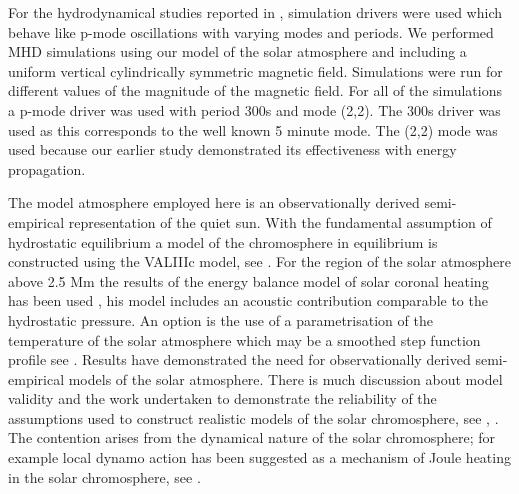 \documentclass{aastex62}
\begin{document}
For the hydrodynamical studies reported in  \citet{Griffiths2018}, simulation drivers were used which behave like p-mode oscillations with varying modes and periods. We performed MHD simulations using our model of the solar atmosphere and including a uniform vertical cylindrically symmetric magnetic field. Simulations were run for different values of the magnitude of the magnetic field. For all of the simulations a p-mode driver was used with period 300s and mode (2,2). The 300s driver  was used as this corresponds to the well known 5 minute mode. The (2,2) mode was used because our earlier study demonstrated its effectiveness with energy propagation.




The model atmosphere employed here is an observationally derived semi-empirical representation of the quiet sun. With the fundamental assumption of hydrostatic equilibrium a model of the chromosphere in equilibrium is constructed using the VALIIIc model, see \citet{Vernazza1981}. For the region of the solar atmosphere above 2.5 Mm the results of the energy balance model of solar coronal heating has been used \citep[see][]{McWhirter1975}, his model includes an acoustic contribution comparable to the hydrostatic pressure. An option is the use of a parametrisation of the temperature of the solar atmosphere which may be a smoothed step function profile see \citet{Murawski2010}. Results have demonstrated the need for observationally derived semi-empirical models of the solar atmosphere. There is much discussion about model validity and the work undertaken to 
demonstrate the reliability of the assumptions used to construct realistic models of the solar chromosphere, see \citet{Carlsson1995}, \citet{Kalkofen2012}. The contention arises from the dynamical nature of the solar chromosphere; for example local dynamo action has been suggested as a mechanism of Joule heating in the solar chromosphere, see \citet{Leenaarts2011}.  
\end{document}
